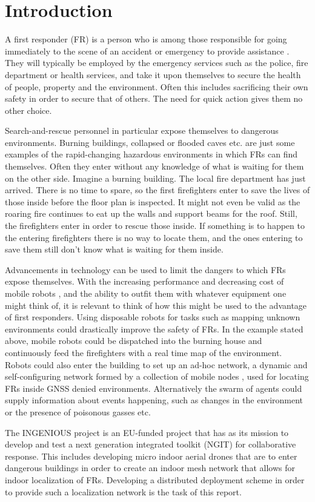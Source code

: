 \section{Introduction}

A first responder (FR) is a person who is among those responsible for going immediately to the scene of an accident or emergency to provide assistance \cite{FR}.
They will typically be employed by the emergency services such as the police, fire department or health services, and take it upon themselves to secure the health of people, property and the environment.
Often this includes sacrificing their own safety in order to secure that of others. The need for quick action gives them no other choice.

Search-and-rescue personnel in particular expose themselves to dangerous environments. Burning buildings, collapsed or flooded caves etc. are just some examples of the rapid-changing
hazardous environments in which FRs can find themselves. Often they enter without any knowledge of what is waiting for them on the other side. Imagine a burning building. The local fire department has just arrived. There is no time to 
spare, so the first firefighters enter to save the lives of those inside before the floor plan is inspected. It might not even be valid as the roaring fire continues to eat up the walls and support beams for the roof. Still, the firefighters enter in order to rescue those inside.
If something is to happen to the entering firefighters there is no way to locate them, and the ones entering to save them still don't know what is waiting for them inside.

Advancements in technology can be used to limit the dangers to which FRs expose themselves. With the increasing performance and decreasing cost of mobile robots \cite{MAV_enabling}, and the ability to outfit them with whatever equipment one might think of, it is relevant to think of how 
this might be used to the advantage of first responders. Using disposable robots for tasks such as mapping unknown environments could drastically improve the safety of FRs. In the example stated above, mobile robots could be dispatched into the burning house
and continuously feed the firefighters with a real time map of the environment. Robots could also enter the building to set up an ad-hoc network, a dynamic and self-configuring network formed by a collection of mobile nodes \cite{GAVHALE2016477}, used for locating FRs inside GNSS denied environments.
Alternatively the swarm of agents could supply information about events happening, such as changes in the environment or the presence of poisonous gasses etc.

The INGENIOUS project is an EU-funded project that has as its mission to develop and test a next generation integrated toolkit (NGIT) for collaborative response. This includes 
developing micro indoor aerial drones that are to enter dangerous buildings in order to create an indoor mesh network that allows for indoor localization of FRs.
Developing a distributed deployment scheme in order to provide such a localization network is the task of this report.